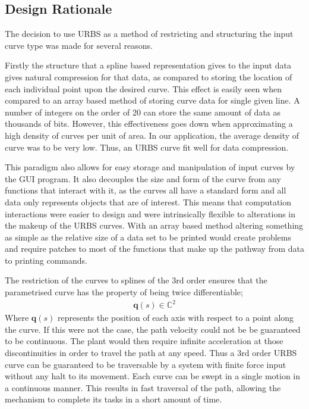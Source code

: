 \subsection{Design Rationale}

The decision to use URBS as a method of restricting and structuring the input curve type was made for several reasons. 

Firstly the structure that a spline based representation gives to the input data gives natural compression for that data, as compared to storing the location of each individual point upon the desired curve. This effect is easily seen when compared to an array based method of storing curve data for single given line. A number of integers on the order of 20 can store the same amount of data as thousands of bits. However, this effectiveness goes down when approximating a high density of curves per unit of area. In our application, the average density of curve was to be very low. Thus, an URBS curve fit well for data compression. 

This paradigm also allows for easy storage and manipulation of input curves by the GUI program. It also decouples the size and form of the curve from any functions that interact with it, as the curves all have a standard form and all data only represents objects that are of interest. This means that computation interactions were easier to design and were intrinsically flexible to alterations in the makeup of the URBS curves. With an array based method altering something as simple as the relative size of a data set to be printed would create problems and require patches to most of the functions that make up the pathway from data to printing commands.

The restriction of the curves to splines of the 3rd order ensures that the parametrised curve has the property of being twice differentiable;
\begin{align*}
\textbf{q}(s) \in \mathbb{C}^2
\end{align*}
Where $\textbf{q}(s)$ represents the position of each axis with respect to a point along the curve.
If this were not the case, the path velocity could not be be guaranteed to be continuous. The plant would then require infinite acceleration at those discontinuities in order to travel the path at any speed. Thus a 3rd order URBS curve can be guaranteed to be traversable by a system with finite force input without any halt to its movement. Each curve can be swept in a single motion in a continuous manner. This results in fast traversal of the path, allowing the mechanism to complete its tasks in a short amount of time.

